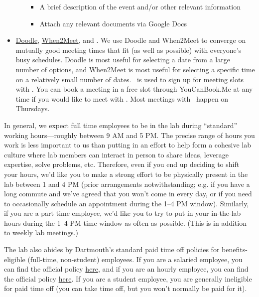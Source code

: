 \documentclass{tufte-book} %
\begin{document}
\begin{itemize}
\begin{itemize}
\begin{itemize}
\item A brief description of the event and/or other relevant
  information
\item Attach any relevant documents via Google Docs
\end{itemize}
\end{itemize}
\item \href{http://www.doodle.com}{Doodle},
  \href{http://www.when2meet.com}{When2Meet}, and
  \meeting.  We use
  Doodle and When2Meet to converge on mutually good meeting times that
  fit (as well as possible) with everyone's busy schedules.  Doodle is
  most useful for selecting a date from a large number of options, and
  When2Meet is most useful for selecting a specific time on a
  relatively small number of dates.  \meeting~is used to sign up
  for meeting slots with \director.  You can book a meeting in a free
  slot through YouCanBook.Me at any time if you would like to meet
  with \director.  Most meetings with \director~happen on Thursdays.
\end{itemize}


 \noindent In general, we expect full time employees to be in the lab
 during ``standard'' working hours---roughly between 9 AM and 5 PM.
 The precise range of hours you work is less important to us than
 putting in an effort to help form a cohesive lab culture where lab
 members can interact in person to share ideas, leverage expertise,
 solve problems, etc.  Therefore, even if you end up deciding to shift
 your hours, we'd like you to make a strong effort to be physically
 present in the lab between 1 and 4 PM (prior arrangements
 notwithstanding; e.g. if you have a long commute and we've agreed
 that you won't come in every day, or if you need to occasionally
 schedule an appointment during the 1--4 PM window).  Similarly, if
 you are a part time employee, we'd like you to try to put in your
 in-the-lab hours during the 1--4 PM time window as often as possible.
 (This is in addition to weekly lab meetings.)

 The lab also abides by Dartmouth's standard paid time off policies
 for benefits-eligible (full-time, non-student) employees.  If you are
 a salaried employee, you can find the official policy
 \href{http://www.dartmouth.edu/~hrs/pdfs/paid_time_off_salaried.pdf}{here},
 and if you are an hourly employee, you can find the official policy
 \href{http://www.dartmouth.edu/~hrs/pdfs/Paid_Time_Off_Hourly.pdf}{here}.
 If you are a student employee, you are generally ineligible for paid
 time off (you can take time off, but you won't normally be paid for
 it).
\end{document}
